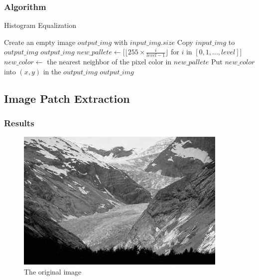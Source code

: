 \documentclass{article}
\begin{document}
\subsubsection{Algorithm}
\begin{algorithm}[h]
\centering
\caption{Histogram Equalization}
  \begin{algorithmic}[1]
      \State Create an empty image $output\_img$ with $input\_img.size$
      	\State Copy $input\_img$ to $output\_img$
      	\State \Return $output\_img$
      \EndIf
      \State $new\_pallete \gets [\lfloor255 \times \frac{i}{level-1}\rfloor$ for $i$ in $[0, 1, ..., level]$]
      	\State $new\_color \gets$ the nearest neighbor of the pixel color in $new\_pallete$
      	\State Put $new\_color$ into $(x, y)$ in the $output\_img$
      \EndFor
      \State \Return $output\_img$
    \EndFunction
  \end{algorithmic}
\end{algorithm}


\subsection{Image Patch Extraction}

\subsubsection{Results}
\begin{figure}[H]
	\centering
	\includegraphics[width=288pt]{../img/02.png}
	\caption{The original image}
\end{figure}
\end{document}
